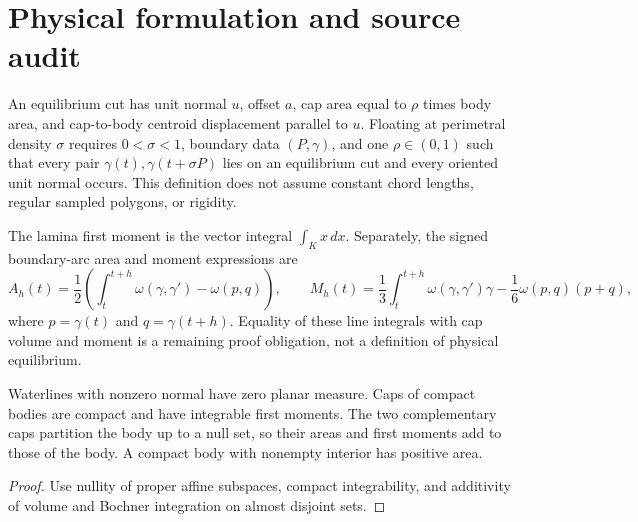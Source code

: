 \section{Physical formulation and source audit}

\begin{definition}
\label{def:physical}
\leanok
{}
An equilibrium cut has unit normal $u$, offset $a$, cap area equal to
$\rho$ times body area, and cap-to-body centroid displacement parallel to $u$.
Floating at perimetral density $\sigma$ requires $0<\sigma<1$, boundary
data $(P,\gamma)$, and one $\rho\in(0,1)$ such that every pair
$\gamma(t),\gamma(t+\sigma P)$ lies on an equilibrium cut and every
oriented unit normal occurs. This definition does not assume constant
chord lengths, regular sampled polygons, or rigidity.
\end{definition}

\begin{definition}
\label{def:cap-moments}
\leanok
{}
The lamina first moment is the vector integral $\int_K x\,dx$.
Separately, the signed boundary-arc area and moment expressions are
\[
 A_h(t)=\frac12\left(\int_t^{t+h}\omega(\gamma,\gamma')-\omega(p,q)\right),
 \qquad
 M_h(t)=\frac13\int_t^{t+h}\omega(\gamma,\gamma')\gamma
       -\frac16\omega(p,q)(p+q),
\]
where $p=\gamma(t)$ and $q=\gamma(t+h)$.
Equality of these line integrals with cap volume and moment is a remaining
proof obligation, not a definition of physical equilibrium.
\end{definition}

\begin{lemma}
\label{lem:cap-measure}
\leanok
{}
Waterlines with nonzero normal have zero planar measure. Caps of compact bodies
are compact and have integrable first moments. The two complementary caps
partition the body up to a null set, so their areas and first moments add to
those of the body. A compact body with nonempty interior has positive area.
\end{lemma}
\begin{proof}
\leanok
Use nullity of proper affine subspaces, compact integrability, and additivity
of volume and Bochner integration on almost disjoint sets.
\end{proof}

